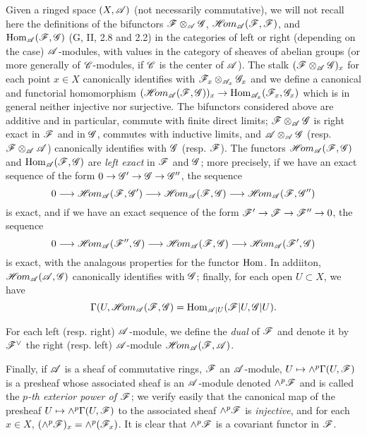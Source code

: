 \begin{env}[4.1.5]
\label{env-0.4.1.5}
Given a ringed space $(X,\mathscr{A})$ (not necessarily commutative), we will not
recall here the definitions of the bifunctors $\mathscr{F}\otimes_\mathscr{A}\mathscr{G}$,
$\mathscr{H}\!{om}_\mathscr{A}(\mathscr{F},\mathscr{F})$, and ${\mathop{\mathrm{Hom}}\nolimits}_\mathscr{A}(\mathscr{F},\mathscr{G})$
(G, II, 2.8 and 2.2) in the categories of left or right (depending on the case)
$\mathscr{A}$-modules, with values in the category of sheaves of abelian groups (or
more generally of $\mathscr{C}$-modules, if $\mathscr{C}$ is the center of $\mathscr{A}$). The
stalk $(\mathscr{F}\otimes_\mathscr{A}\mathscr{G})_x$ for each point $x\in X$ canonically
identifies with $\mathscr{F}_x\otimes_{\mathscr{A}_x}\mathscr{G}_x$ and we define a canonical
and functorial homomorphism
$(\mathscr{H}\!{om}_\mathscr{A}(\mathscr{F},\mathscr{G}))_x\to{\mathop{\mathrm{Hom}}\nolimits}_{\mathscr{A}_x}(\mathscr{F}_x,\mathscr{G}_x)$ which is
in general neither injective nor surjective. The bifunctors considered above are
additive and in particular, commute with finite direct limits;
$\mathscr{F}\otimes_\mathscr{A}\mathscr{G}$ is right exact in $\mathscr{F}$ and in $\mathscr{G}$,
commutes with inductive limits, and $\mathscr{A}\otimes_\mathscr{A}\mathscr{G}$
(resp. $\mathscr{F}\otimes_\mathscr{A}\mathscr{A}$) canonically identifies with $\mathscr{G}$
(resp. $\mathscr{F}$). The functors $\mathscr{H}\!{om}_\mathscr{A}(\mathscr{F},\mathscr{G})$ and
${\mathop{\mathrm{Hom}}\nolimits}_\mathscr{A}(\mathscr{F},\mathscr{G})$ are {\em left exact} in $\mathscr{F}$ and $\mathscr{G}$;
more precisely, if we have an exact sequence of the form
$0\to\mathscr{G}'\to\mathscr{G}\to\mathscr{G}''$, the sequence
\[
  0\longrightarrow\mathscr{H}\!{om}_\mathscr{A}(\mathscr{F},\mathscr{G}')\longrightarrow
  \mathscr{H}\!{om}_\mathscr{A}(\mathscr{F},\mathscr{G})\longrightarrow\mathscr{H}\!{om}_\mathscr{A}(\mathscr{F},\mathscr{G}'')
\]
is exact, and if we have an exact sequence of the form
$\mathscr{F}'\to\mathscr{F}\to\mathscr{F}''\to 0$, the sequence
\[
  0\longrightarrow\mathscr{H}\!{om}_\mathscr{A}(\mathscr{F}'',\mathscr{G})\longrightarrow
  \mathscr{H}\!{om}_\mathscr{A}(\mathscr{F},\mathscr{G})\longrightarrow\mathscr{H}\!{om}_\mathscr{A}(\mathscr{F}',\mathscr{G})
\]
is exact, with the analagous properties for the functor ${\mathop{\mathrm{Hom}}\nolimits}$. In addiiton,
$\mathscr{H}\!{om}_\mathscr{A}(\mathscr{A},\mathscr{G})$ canonically identifies with $\mathscr{G}$; finally,
for each open $U\subset X$, we have
\[
  \Gamma(U,\mathscr{H}\!{om}_\mathscr{A}(\mathscr{F},\mathscr{G})={\mathop{\mathrm{Hom}}\nolimits}_{\mathscr{A}|U}(\mathscr{F}|U,\mathscr{G}|U).
\]

For each left (resp. right) $\mathscr{A}$-module, we define the {\em dual} of
$\mathscr{F}$ and denote it by ${\mathscr{F}}^\vee$ the right (resp. left) $\mathscr{A}$-module
$\mathscr{H}\!{om}_\mathscr{A}(\mathscr{F},\mathscr{A})$.

Finally, if $\mathscr{A}$ is a sheaf of commutative rings, $\mathscr{F}$ an
$\mathscr{A}$-module, $U\mapsto\wedge^p\Gamma(U,\mathscr{F})$ is a presheaf whose
associated sheaf is an $\mathscr{A}$-module denoted $\wedge^p\mathscr{F}$ and is called
the {\em $p$-th exterior power of $\mathscr{F}$}; we verify easily that the
canonical map of the presheaf $U\mapsto\wedge^p\Gamma(U,\mathscr{F})$ to the
associated sheaf $\wedge^p\mathscr{F}$ is {\em injective}, and for each $x\in X$,
$(\wedge^p\mathscr{F})_x=\wedge^p(\mathscr{F}_x)$. It is clear that $\wedge^p\mathscr{F}$ is a
covariant functor in $\mathscr{F}$.
\end{env}

